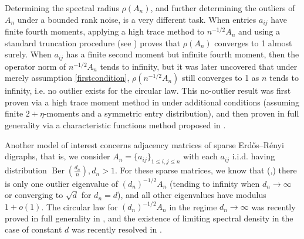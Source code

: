 \documentclass[12pt, reqno]{amsart}
\theoremstyle{definition}
\theoremstyle{remark}
\numberwithin{equation}{section}
\begin{document}
Determining the spectral radius $\rho(A_n)$, and further determining the outliers of $A_n$ under a bounded rank noise, is a very different task.
 When entries $a_{ij}$ have finite fourth moments, applying a high trace method to $n^{-1/2}A_n$ and using a standard truncation procedure (see \cite{Bai1986LimitingBO} \cite{Geman1986THESR}) proves that $\rho(A_n)$
converges to 1 almost surely. When $a_{ij}$ has a finite second moment but infinite fourth moment, then the operator norm of $n^{-1/2}A_n$ tends to infinity, but it was later uncovered that under merely assumption \ref{firstcondition}, $\rho(n^{-1/2}A_n)$ still converges to 1 as $n$ tends to infinity, i.e. no outlier exists for the circular law. This no-outlier result was first proven via a high trace moment method in \cite{ WOS:000435416700013} under additional conditions (assuming finite $2+\eta$-moments and a symmetric entry distribution), and then proven in full generality via a characteristic functions method proposed in \cite{bordenave2021convergence}. 

Another model of interest concerns adjacency matrices of sparse Erdős–Rényi digraphs, that is, we consider $A_n=\{a_{ij}\}_{1\leq i,j\leq n}$ with each $a_{ij}$ i.i.d. having distribution $\operatorname{Ber}(\frac{d_n}{n}),d_n>1$. For these sparse matrices, we know that (\cite{benaych2020spectral},\cite{coste2023sparse}) there is only one outlier eigenvalue of $(d_n)^{-1/2}A_n$ (tending to infinity when $d_n\to\infty$ or converging to $\sqrt{d}$ for $d_n=d$), and all other eigenvalues have modulus $1+o(1)$. The circular law for $(d_n)^{-1/2}A_n$ in the regime $d_n\to\infty$ was recently proved in full generality in \cite{rudelson2019sparse}, and the existence of limiting spectral density in the case of constant $d$ was recently resolved in \cite{sah2023limiting}.
\end{document}
